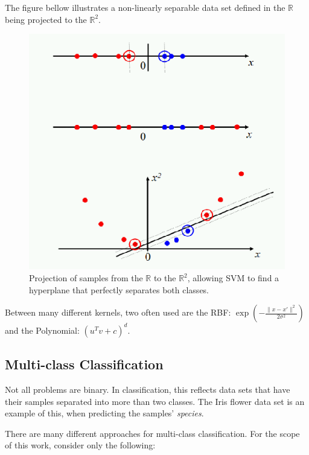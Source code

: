 \documentclass[12pt]{report}
\begin{document}
The figure bellow illustrates a non-linearly separable data set defined in the $\mathbb{R}$ being projected to the $\mathbb{R}^2$.

\begin{figure}[H]
	\centering
	\captionsetup{justification=centering}

	\includegraphics[scale=.4]{svm_kernel}
	\caption{Projection of samples from the $\mathbb{R}$ to the $\mathbb{R}^2$, allowing SVM to find a hyperplane that perfectly separates both classes. \cite{svmkernels}}
	\label{fig:svmkernel}
\end{figure}

Between many different kernels, two often used are the RBF: $\exp(-\frac{\|x -x'\|^2}{2\sigma^2})$ and the Polynomial: $(u^T v + c)^{d}$. \cite{svmkernels}

\subsection{Multi-class Classification}

Not all problems are binary. In classification, this reflects data sets that have their samples separated into more than two classes. The Iris flower data set is an example of this, when predicting the samples' {\em species}.

There are many different approaches for multi-class classification. \cite{rif2008} For the scope of this work, consider only the following:
\end{document}
